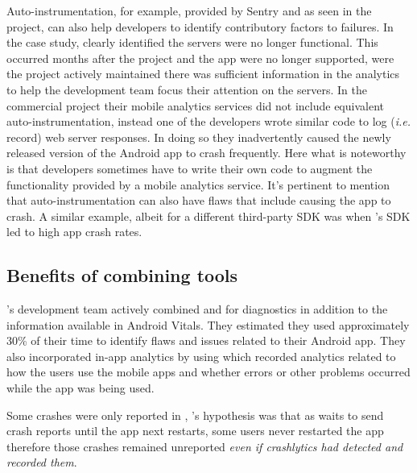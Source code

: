 Auto-instrumentation, for example, provided by Sentry and as seen in the  project, can also help developers to identify contributory factors to failures. In the  case study,  clearly identified the servers were no longer functional. This occurred months after the project and the app were no longer supported, were the project actively maintained there was sufficient information in the analytics to help the development team focus their attention on the servers. In the commercial project their mobile analytics services did not include equivalent auto-instrumentation, instead one of the developers wrote similar code to log (\emph{i.e.} record) web server responses. In doing so they inadvertently caused the newly released version of the Android app to crash frequently. Here what is noteworthy is that developers sometimes have to write their own code to augment the functionality provided by a mobile analytics service. It's pertinent to mention that auto-instrumentation can also have flaws that include causing the app to crash. A similar example, albeit for a different third-party SDK was when 's SDK led to high app crash rates.

\subsection{Benefits of combining tools}
    
's development team actively combined  and  for diagnostics in addition to the information available in Android Vitals. They estimated they used  approximately 30\% of their time to identify flaws and issues related to their Android app.
%
They also incorporated in-app analytics by using  which recorded analytics related to how the users use the mobile apps and whether errors or other problems occurred while the app was being used. 

Some crashes were only reported in , 's hypothesis was that as  waits to send crash reports until the app next restarts, some users never restarted the app therefore those crashes remained unreported \emph{even if crashlytics had detected and recorded them}.

